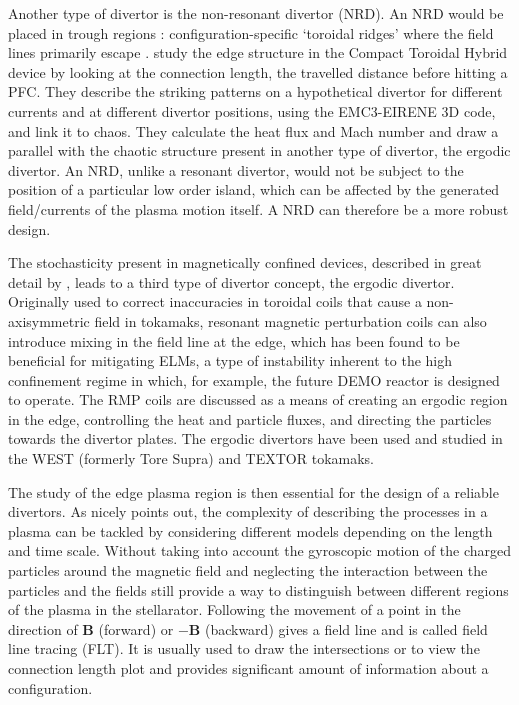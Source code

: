 Another type of divertor is the non-resonant divertor (NRD). An NRD would be placed in trough regions : configuration-specific `toroidal ridges' where the field lines primarily escape \cite{bader_hsx_2017}.\cite{garcia_exploration_2023} study the edge structure in the Compact Toroidal Hybrid device by looking at the connection length, the travelled distance before hitting a PFC. They describe the striking patterns on a hypothetical divertor for different currents and at different divertor positions, using the EMC3-EIRENE 3D code, and link it to chaos. They calculate the heat flux and Mach number and draw a parallel with the chaotic structure present in another type of divertor, the ergodic divertor. An NRD, unlike a resonant divertor, would not be subject to the position of a particular low order island, which can be affected by the generated field/currents of the plasma motion itself. A NRD can therefore be a more robust design.

The stochasticity present in magnetically confined devices, described in great detail by \cite{abdullaev_magnetic_2014}, leads to a third type of divertor concept, the ergodic divertor. Originally used to correct inaccuracies in toroidal coils that cause a non-axisymmetric field in tokamaks, resonant magnetic perturbation coils can also introduce mixing in the field line at the edge, which has been found to be beneficial for mitigating ELMs, a type of instability inherent to the high confinement regime in which, for example, the future DEMO reactor is designed to operate. The RMP coils are discussed as a means of creating an ergodic region in the edge, controlling the heat and particle fluxes, and directing the particles towards the divertor plates. The ergodic divertors have been used and studied in the WEST (formerly Tore Supra) and TEXTOR tokamaks.

The study of the edge plasma region is then essential for the design of a reliable divertors. As \cite{imbert-gerard_introduction_2020} nicely points out, the complexity of describing the processes in a plasma can be tackled by considering different models depending on the length and time scale. Without taking into account the gyroscopic motion of the charged particles around the magnetic field and neglecting the interaction between the particles and the fields still provide a way to distinguish between different regions of the plasma in the stellarator. Following the movement of a point in the direction of $\textbf{B}$ (forward) or $-\textbf{B}$ (backward) gives a field line and is called field line tracing (FLT). It is usually used to draw the intersections or to view the connection length plot and provides significant amount of information about a configuration.

